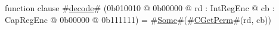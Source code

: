 function clause #\hyperref[sailMIPSzdecode]{decode}# (0b010010 @ 0b00000 @ rd : IntRegEnc @ cb : CapRegEnc @    0b00000 @ 0b111111) = #\hyperref[sailMIPSzSome]{Some}#(#\hyperref[sailMIPSzCGetPerm]{CGetPerm}#(rd, cb))
